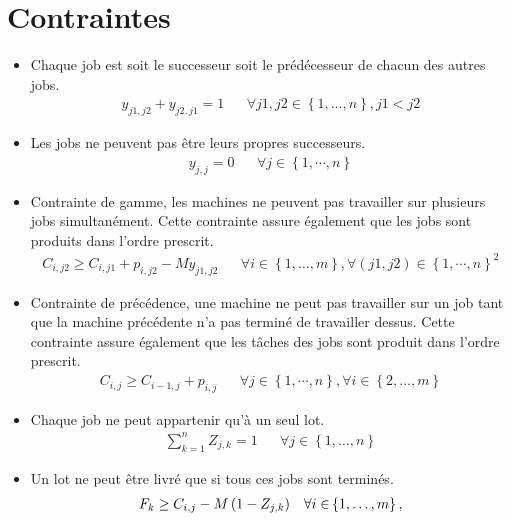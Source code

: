 \section*{Contraintes}

\begin{itemize}
	\item
	      Chaque job est soit le successeur soit le prédécesseur de chacun des autres jobs.
	      \begin{align}
		      y_{j1,j2}+y_{j2,j1}=1 &  &
		      \forall j1,j2\in\left\{1,\dotsc,n\right\}, j1<j2
	      \end{align}
	\item
	      Les jobs ne peuvent pas être leurs propres successeurs.
	      \begin{align}
		      y_{j,j}=0 &  &
		      \forall j\in \left\{1,\cdots, n\right\}
	      \end{align}
	\item
	      Contrainte de gamme, les machines ne peuvent pas travailler sur plusieurs jobs simultanément.
	      Cette contrainte assure également que les jobs sont produits dans l'ordre prescrit.
	      \begin{align}
		      C_{i,j2} \geq C_{i,j1}+p_{i,j2}-M y_{j1,j2} &  &
		      \forall i\in\left\{1,\dotsc,m\right\}, \forall\left(j1,j2\right)\in\left\{1,\cdots,n\right\}^2
	      \end{align}
	\item
	      Contrainte de précédence, une machine ne peut pas travailler sur un job tant que la machine précédente n’a pas terminé de travailler dessus.
	      Cette contrainte assure également que les tâches des jobs sont produit dans l'ordre prescrit.
	      \begin{align}
		      C_{i,j}\geq C_{i-1,j}+p_{i,j} &  &
		      \forall j\in\left\{1,\cdots,n\right\},\forall i\in\left\{2,\dotsc,m\right\}
	      \end{align}
	\item
	      Chaque job ne peut appartenir qu’à un seul lot.
	      \begin{align}
		      \sum_{k=1}^{n}Z_{j,k}=1 &  &
		      \forall j \in\left\{1,\dotsc,n \right\}
	      \end{align}
	\item
	      Un lot ne peut être livré que si tous ces jobs sont terminés.
	      \begin{align}
		      F_k \geq C_{i,j} - M\left(1-Z_{j,k}\right) &  & \forall i \in & \left\{1,\dotsc, m \right\}, \notag \\

\end{align}
\end{itemize}
